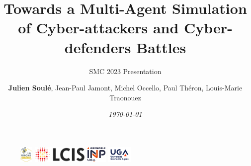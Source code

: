 \author{\textbf{Julien Soulé}, Jean-Paul Jamont, Michel Occello, Paul Théron, Louis-Marie Traonouez}

\title{\textbf{Towards a Multi-Agent Simulation of Cyber-attackers and Cyber-defenders Battles}}

\subtitle{SMC 2023 Presentation}



\date{\textit{\footnotesize \today}}

\begin{frame}[plain]
	\maketitle\vspace{-0.8cm}
	\begin{figure}[ht!]
		\centering
            \includegraphics[height=0.8cm]{figures/la-ruche_logo.png}
            \hspace{0.8cm}
            \includegraphics[height=0.8cm]{figures/lcis_logo.png}
            \hspace{0.8cm}
		\includegraphics[height=0.8cm]{figures/grenoble-inp_logo.png}
            \hspace{0.8cm}
            \includegraphics[height=0.8cm]{figures/uga_logo.jpg}
	\end{figure}
\end{frame}